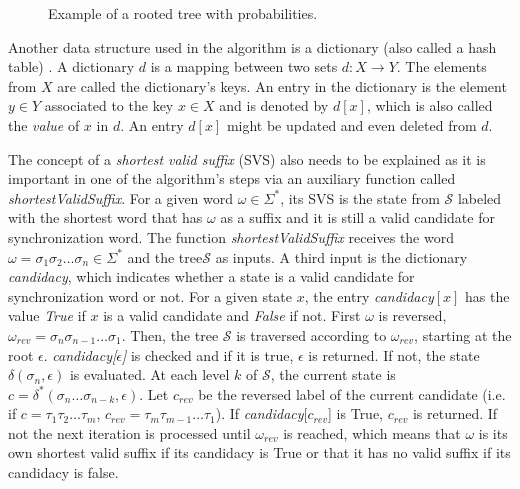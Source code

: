 {\begin{figure}[h]
\centering
{}
\caption{Example of a rooted tree with probabilities. \label{fig:rtp}}
\end{figure}
 
 Another data structure used in the algorithm is a dictionary (also called a hash table) \citep{thomas2001introduction}. A dictionary $d$ is a mapping between two sets $d: X \rightarrow Y$. The elements from $X$ are called the dictionary's keys. An entry in the dictionary is the element $y \in Y$ associated to the key $x \in X$ and is denoted by $d[x]$, which is also called the \textit{value} of $x$ in $d$. An entry $d[x]$ might be updated and even deleted from $d$.
 
The concept of a \textit{shortest valid suffix} (SVS) also needs to be explained as it is important in one of the algorithm's steps via an auxiliary function called \textit{shortestValidSuffix}. For a given word $\omega \in \Sigma^*$, its SVS is the state from $\mathcal{S}$ labeled with the shortest word that has $\omega$ as a suffix and it is still a valid candidate for synchronization word. The function \textit{shortestValidSuffix} receives the word $\omega = \sigma_1\sigma_2\ldots\sigma_n \in \Sigma^*$ and the tree$\mathcal{S}$ as inputs. A third input is the dictionary \textit{candidacy}, which indicates whether a state is a valid candidate for synchronization word or not. For a given state $x$, the entry \textit{candidacy}$[x]$ has the value \textit{True} if $x$ is a valid candidate and \textit{False} if not. First $\omega$ is reversed, $\omega_{rev} = \sigma_n\sigma_{n-1}\ldots\sigma_1$. Then, the tree $\mathcal{S}$ is traversed according to $\omega_{rev}$, starting at the root $\epsilon$. \textit{candidacy[$\epsilon$]} is checked and if it is true, $\epsilon$ is returned. If not, the state $\delta(\sigma_n, \epsilon)$ is evaluated. At each level $k$ of $\mathcal{S}$, the current state is $c = \delta^*(\sigma_n\ldots\sigma_{n-k},\epsilon)$. Let $c_{rev}$ be the reversed label of the current candidate (i.e. if $c = \tau_1\tau_2\ldots\tau_m$, $c_{rev} = \tau_m\tau_{m-1}\ldots\tau_1$). If \textit{candidacy}[$c_{rev}$] is True, $c_{rev}$ is returned. If not the next iteration is processed until $\omega_{rev}$ is reached, which means that $\omega$ is its own shortest valid suffix if its candidacy is True or that it has no valid suffix if its candidacy is false.
 
}
